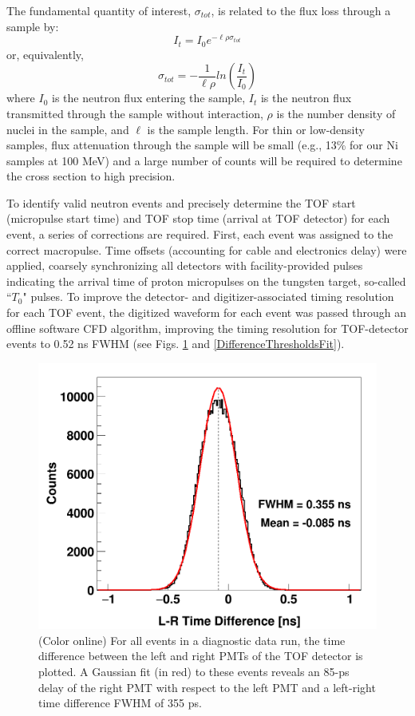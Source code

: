 \documentclass[twocolumn,secnumarabic,amssymb, nobibnotes, aps, prl,
superscriptaddress, nobalancelastpage]{revtex4}
\newcommand{\tot}{\ensuremath{\sigma_{tot}}}
\begin{document}
The fundamental quantity of interest, \tot, is related to the flux
loss through a sample by:
\begin{equation}
I_{t} = I_{0}e^{-{\ell\rho\sigma_{tot}}}
\end{equation}
or, equivalently,
\begin{equation}
    \tot = -\frac{1}{\ell\rho}ln\left(\frac{I_{t}}{I_{0}}\right)
\end{equation}
where $I_{0}$ is the neutron flux entering the sample, $I_{t}$ is the neutron
flux transmitted through the sample without interaction, $\rho$ is the number
density of nuclei in the sample, and $\ell$ is the sample length. For thin
or low-density samples, flux attenuation through the sample will be small
(e.g., 13\% for our Ni samples at 100 MeV) and a large number
of counts will be required to determine the cross section to high
precision.

To identify valid neutron events and precisely determine the TOF start (micropulse start 
time) and TOF stop time (arrival at TOF detector) for each event, a series of corrections 
are required.  First, each event was assigned to the correct macropulse.
Time offsets (accounting for cable and
electronics delay) were applied, coarsely synchronizing all detectors with
facility-provided pulses indicating the arrival time of proton micropulses on the
tungsten target, so-called ``$T_{0}$" pulses.
To improve the detector- and digitizer-associated timing resolution for each TOF
event, the digitized waveform for each event was passed 
through an offline software CFD algorithm, improving the timing resolution 
for TOF-detector events to 0.52 ns FWHM (see Figs. \ref{LRTimeDifferenceLinear}
and \ref{DifferenceThresholdsFit}).

\begin{figure}
    \includegraphics[scale=0.3]{figures/Difference_Linear.png}
    \caption{(Color online) For all events in a diagnostic data run, the time difference   
        between the left and right PMTs of the TOF detector is plotted.
        A Gaussian fit (in red) to these events reveals an 85-ps delay of the right PMT with 
    respect to the left PMT and a left-right time difference FWHM of 355 ps.}
    \label{LRTimeDifferenceLinear}
\end{figure}
\end{document}
